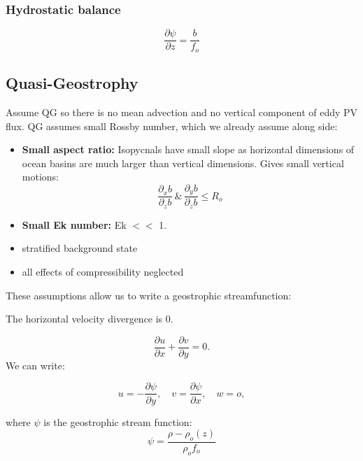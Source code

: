 \subsubsection*{Hydrostatic balance}
\begin{equation}
\frac{\partial \psi}{\partial z}=\frac{b}{f_o}
\end{equation}

\subsection*{Quasi-Geostrophy}
\label{sec:QG}
Assume \gls{QG} so there is no mean advection and no vertical component of eddy \gls{PV} flux. QG assumes small Rossby number, which we already assume along side:

\begin{itemize}
\item \textbf{Small aspect ratio:} Isopycnals have small slope as horizontal dimensions of ocean basins are much larger than vertical dimensions. Gives small vertical motions: \begin{equation}
\frac{\partial_x b}{\partial_z b}\, \& \,\frac{\partial_y b}{\partial_z b} \leq R_o 
\end{equation}
\item \textbf{Small Ek number:} Ek $<<$  1. 
\item stratified background state 
\item all effects of compressibility neglected
\end{itemize}

These assumptions allow us to write a geostrophic streamfunction:

The horizontal velocity divergence is 0.


\begin{equation}
\frac{\partial u}{\partial x} + \frac{\partial v}{\partial y} =0 .
\end{equation}
We can write:

\begin{equation}
u=-\frac{\partial \psi}{\partial y}, \quad v=\frac{\partial \psi}{\partial x}, \quad w=o ,
\end{equation}

where $\psi$ is the geostrophic stream function:
\begin{equation}
\psi = \frac{\rho -\rho_o(z)}{\rho_of_o}
\end{equation}

